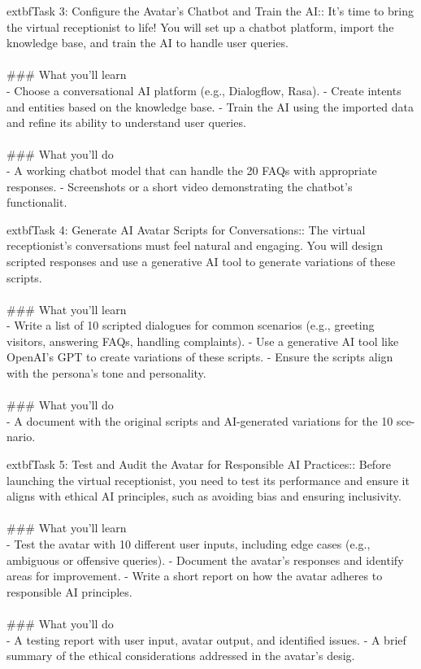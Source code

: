 \documentclass{article}
\begin{document}
	extbf{Task 3:} Configure the Avatar’s Chatbot and Train the AI:: It’s time to bring the virtual receptionist to life! You will set up a chatbot platform, import the knowledge base, and train the AI to handle user queries. \\
 \\
### What you'll learn \\
- Choose a conversational AI platform (e.g., Dialogflow, Rasa). - Create intents and entities based on the knowledge base. - Train the AI using the imported data and refine its ability to understand user queries. \\
 \\
### What you'll do \\
- A working chatbot model that can handle the 20 FAQs with appropriate responses. - Screenshots or a short video demonstrating the chatbot’s functionalit.

	extbf{Task 4:} Generate AI Avatar Scripts for Conversations:: The virtual receptionist’s conversations must feel natural and engaging. You will design scripted responses and use a generative AI tool to generate variations of these scripts. \\
 \\
### What you'll learn \\
- Write a list of 10 scripted dialogues for common scenarios (e.g., greeting visitors, answering FAQs, handling complaints). - Use a generative AI tool like OpenAI’s GPT to create variations of these scripts. - Ensure the scripts align with the persona’s tone and personality. \\
 \\
### What you'll do \\
- A document with the original scripts and AI-generated variations for the 10 sce- nario.

	extbf{Task 5:} Test and Audit the Avatar for Responsible AI Practices:: Before launching the virtual receptionist, you need to test its performance and ensure it aligns with ethical AI principles, such as avoiding bias and ensuring inclusivity. \\
 \\
### What you'll learn \\
- Test the avatar with 10 different user inputs, including edge cases (e.g., ambiguous or offensive queries). - Document the avatar’s responses and identify areas for improvement. - Write a short report on how the avatar adheres to responsible AI principles. \\
 \\
### What you'll do \\
- A testing report with user input, avatar output, and identified issues. - A brief summary of the ethical considerations addressed in the avatar’s desig.
\end{document}
